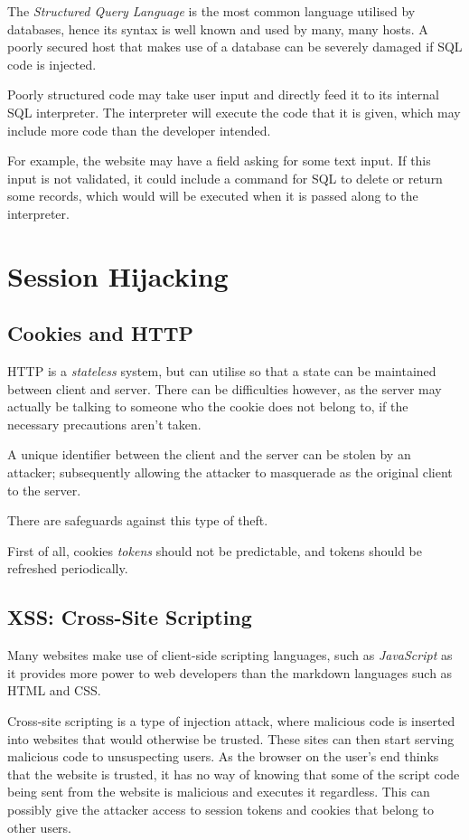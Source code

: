 \documentclass{article}
\begin{document}
The \textit{Structured Query Language} is the most common language utilised by databases, hence its syntax is well known and used by many, many hosts. A poorly secured host that makes use of a database can be severely damaged if SQL code is injected.

Poorly structured code may take user input and directly feed it to its internal SQL interpreter. The interpreter will execute the code that it is given, which may include more code than the developer intended. 

For example, the website may have a field asking for some text input. If this input is not validated, it could include a command for SQL to delete or return some records, which would will be executed when it is passed along to the interpreter.


\section{Session Hijacking}

\subsection{Cookies and HTTP}

HTTP is a \textit{stateless} system, but can utilise so that a state can be maintained between client and server. There can be difficulties however, as the server may actually be talking to someone who the cookie does not belong to, if the necessary precautions aren't taken.

A unique identifier between the client and the server can be stolen by an attacker; subsequently allowing the attacker to masquerade as the original client to the server.

There are safeguards against this type of theft.

First of all, cookies \textit{tokens} should not be predictable, and tokens should be refreshed periodically.

\subsection{XSS: Cross-Site Scripting}

Many websites make use of client-side scripting languages, such as \textit{JavaScript} as it provides more power to web developers than the markdown languages such as HTML and CSS.

Cross-site scripting is a type of injection attack, where malicious code is inserted into websites that would otherwise be trusted. These sites can then start serving malicious code to unsuspecting users. As the browser on the user's end thinks that the website is trusted, it has no way of knowing that some of the script code being sent from the website is malicious and executes it regardless. This can possibly give the attacker access to session tokens and cookies that belong to other users.
\end{document}
